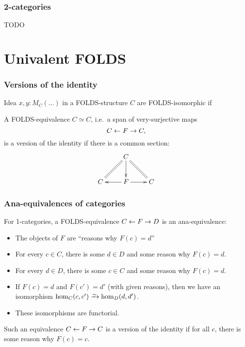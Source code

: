 \documentclass{beamer}
\begin{document}
\begin{frame}
  \frametitle{2-categories}
  TODO
\end{frame}


\section{Univalent FOLDS}
\label{sec:univalent-folds}

\begin{frame}
  \frametitle{Versions of the identity}
  \begin{block}{Idea}
    $x,y:M_C(\dots)$ in a FOLDS-structure $C$ are \alert<1>{FOLDS-isomorphic} if\\ 
  \end{block}
  \pause\pause\pause
  \begin{definition}
    A FOLDS-equivalence $C\simeq C$, i.e.\ a span of very-surjective maps
    \[ C \leftarrow F \to C, \]
    is \alert{a version of the identity} if there is a common section:
    \[ \xymatrix{ &C \ar[d] \ar@{=}[dl] \ar@{=}[dr] \\ C & F \ar[l] \ar[r] & C } \]
  \end{definition}
\end{frame}

\begin{frame}
  \frametitle{Ana-equivalences of categories}
  For 1-categories, a FOLDS-equivalence $C \leftarrow F \to D$ is an \alert<1>{ana-equivalence}:
  \begin{itemize}
  \item The objects of $F$ are ``reasons why $F(c) = d$''
  \item For every $c\in C$, there is some $d\in D$ and some reason why $F(c)=d$.
  \item For every $d\in D$, there is some $c\in C$ and some reason why $F(c)=d$.
  \item If $F(c)=d$ and $F(c')=d'$ (with given reasons), then we have an isomorphism $\hom_C(c,c') \toiso \hom_D(d,d')$.
  \item These isomorphisms are functorial.
  \end{itemize}
  \pause
  Such an equivalence $C \leftarrow F \to C$ is a \alert{version of the identity} if for all $c$, there is some reason why $F(c)=c$.
\end{frame}
\end{document}
